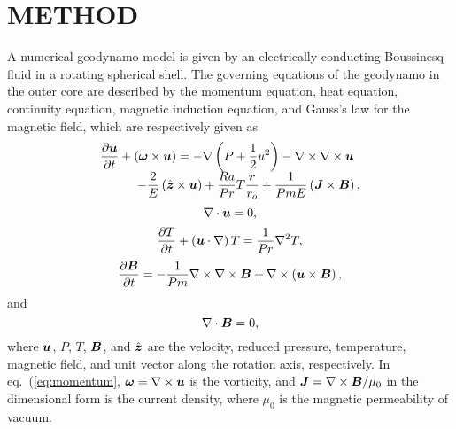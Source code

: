 \section{METHOD}

A numerical geodynamo model is given by an electrically conducting Boussinesq fluid in a rotating spherical shell. The governing equations of the geodynamo in the outer core are described by the momentum equation, heat equation, continuity equation, magnetic induction equation, and Gauss's law for the magnetic field, which are respectively given as
%
\begin{equation}
\begin{array}{l}
\displaystyle
\frac{\partial \mbox{\boldmath$u$}}{\partial t} + \left(\mbox{\boldmath$\omega$} \times \mbox{\boldmath$u$}\right)
 = - \nabla \left(P+\frac{1}{2}u^{2} \right) - \nabla \times \nabla \times \mbox{\boldmath$u$}
\\
\displaystyle
\hspace*{3em}
      - \frac{2}{E} \left(\hat{\mbox{\boldmath$z$}} \times \mbox{\boldmath$u$} \right)
  + \frac{Ra}{Pr} T \frac{\mbox{\boldmath$r$}}{r_{o}}
        + \frac{1}{Pm E} \left(\mbox{\boldmath$J$} \times \mbox{\boldmath$B$} \right),
\label{eq:momentum}
\end{array}
\end{equation}
%
\begin{equation}
\nabla \cdot \mbox{\boldmath$u$} = 0, 
\label{eq:conservation}
\end{equation}
%
\begin{equation}
\frac{\partial T}{\partial t} + \left(\mbox{\boldmath$u$} \cdot \nabla \right) T
 = \frac{1}{Pr} \nabla^{2} T,
\label{eq:heat}
\end{equation}
%
\begin{equation}
 \frac{\partial \mbox{\boldmath$B$}}{\partial t}
 = -\frac{1}{Pm}  \nabla \times \nabla \times \mbox{\boldmath$B$}
       + \nabla \times \left(\mbox{\boldmath$u$} \times \mbox{\boldmath$B$} \right),
\label{eq:induction}
\end{equation}
%
and
\begin{equation}
\nabla \cdot \mbox{\boldmath$B$} = 0,
\label{eq:Gauss_B}
\end{equation}
%
where $\mbox{\boldmath$u$}$, $P$, $T$, $\mbox{\boldmath$B$}$, and $\hat{\mbox{\boldmath$z$}}$ are the velocity, reduced pressure, temperature, magnetic field, and unit vector along the rotation axis, respectively.
In eq.~(\ref{eq:momentum}, $\mbox{\boldmath$\omega$} = \nabla \times \mbox{\boldmath$u$}$ is the vorticity, and $\mbox{\boldmath$J$} = \nabla \times \mbox{\boldmath$B$} / \mu_0$ in the dimensional form is the current density, where $\mu_0$ is the magnetic permeability of vacuum.
